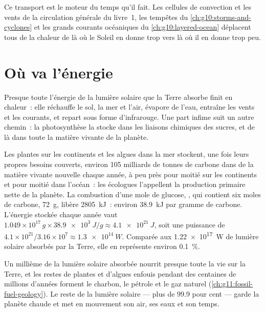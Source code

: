 Ce transport est le moteur du temps qu'il fait. Les cellules de convection
et les vents de la circulation générale du livre~1, les tempêtes du
\cref{ch:g10:storms-and-cyclones} et les grands courants océaniques du
\cref{ch:g10:layered-ocean} déplacent tous de la chaleur de là où le Soleil
en donne trop vers là où il en donne trop peu.

\section{Où va l'énergie}

Presque toute l'énergie de la lumière solaire que la Terre absorbe finit en
chaleur~: elle réchauffe le sol, la mer et l'air, évapore de l'eau,
entraîne les vents et les courants, et repart sous forme d'infrarouge. Une
part infime suit un autre chemin~: la photosynthèse la stocke dans les
liaisons chimiques des sucres, et de là dans toute la matière vivante de la
planète.

\begin{example}\label{ex:g10:earth-energy-budget:photosynthesis}
Les plantes sur les continents et les algues dans la mer stockent, une fois
leurs propres besoins couverts, environ \num{105} milliards de tonnes de
carbone dans de la matière vivante nouvelle chaque année, à peu près pour
moitié sur les continents et pour moitié dans l'océan~: les écologues
l'appellent la production primaire nette de la planète. La combustion d'une
mole de glucose, , qui contient six moles de carbone,
\qty{72}{g}, libère \qty{2805}{kJ}~: environ \qty{38.9}{kJ} par gramme de
carbone. L'énergie stockée chaque année vaut
$1.049\times10^{17}\,\unit{g} \times \qty{38.9e3}{J/g} \approx
\qty{4.1e21}{J}$, soit une puissance de
$4.1\times10^{21}/3.16\times10^{7} \approx
\qty{1.3e14}{W}$. Comparée aux
\qty{1.22e17}{W} de lumière solaire absorbés par la Terre, elle en
représente environ \qty{0.1}{\percent}.
\end{example}

\begin{remark}\label{rem:g10:earth-energy-budget:life}
Un millième de la lumière solaire absorbée nourrit presque toute la vie sur
la Terre, et les restes de plantes et d'algues enfouis pendant des
centaines de millions d'années forment le charbon, le pétrole et le gaz
naturel (\cref{ch:g11:fossil-fuel-geology}). Le reste de la lumière
solaire --- plus de 99.9 pour cent --- garde la planète chaude et met en
mouvement son air, ses eaux et son temps.
\end{remark}

